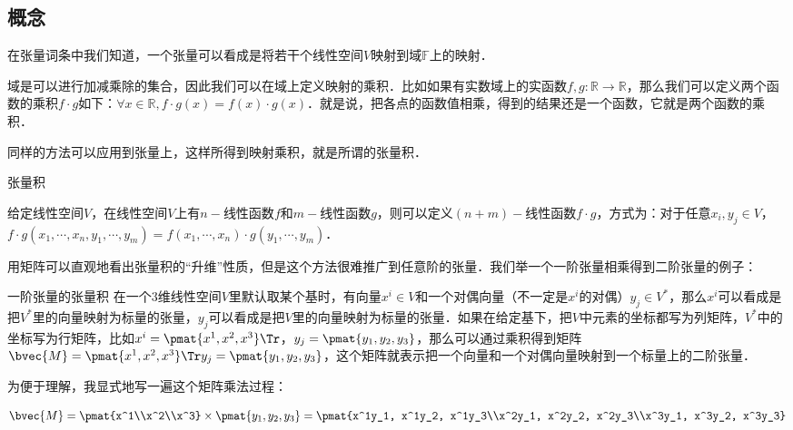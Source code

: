 
\subsection{概念}
在张量词条中我们知道，一个张量可以看成是将若干个线性空间$V$映射到域$\mathbb{F}$上的映射．

域是可以进行加减乘除的集合，因此我们可以在域上定义映射的乘积．比如如果有实数域上的实函数$f, g:\mathbb{R}\rightarrow\mathbb{R}$，那么我们可以定义两个函数的乘积$f\cdot g$如下：$\forall x\in\mathbb{R}, f\cdot g(x)=f(x)\cdot g(x)$．就是说，把各点的函数值相乘，得到的结果还是一个函数，它就是两个函数的乘积．

同样的方法可以应用到张量上，这样所得到映射乘积，就是所谓的张量积．

\begin{definition}{张量积}

给定线性空间$V$，在线性空间$V$上有$n-$线性函数$f$和$m-$线性函数$g$，则可以定义$(n+m)-$线性函数$f\cdot g$，方式为：对于任意$x_i, y_j\in V$，$f\cdot g(x_1, \cdots, x_n, y_1, \cdots, y_m)=f(x_1, \cdots, x_n)\cdot g(y_1, \cdots, y_m)$．

\end{definition}

用矩阵可以直观地看出张量积的“升维”性质，但是这个方法很难推广到任意阶的张量．我们举一个一阶张量相乘得到二阶张量的例子：

\begin{example}{一阶张量的张量积}
在一个$3$维线性空间$V$里默认取某个基时，有向量$x^i\in V$和一个对偶向量（不一定是$x^i$的对偶）$y_j\in V^*$，那么$x^i$可以看成是把$V^*$里的向量映射为标量的张量，$y_j$可以看成是把$V$里的向量映射为标量的张量．如果在给定基下，把$V$中元素的坐标都写为列矩阵，$V^*$中的坐标写为行矩阵，比如$x^i=\pmat{x^1, x^2, x^3}\Tr$，$y_j=\pmat{y_1, y_2, y_3}$，那么可以通过乘积得到矩阵$\bvec{M}=\pmat{x^1, x^2, x^3}\Tr y_j=\pmat{y_1, y_2, y_3}$，这个矩阵就表示把一个向量和一个对偶向量映射到一个标量上的二阶张量．

为便于理解，我显式地写一遍这个矩阵乘法过程：

\begin{equation}
\bvec{M}=\pmat{x^1\\x^2\\x^3}\times\pmat{y_1, y_2, y_3}=\pmat{x^1y_1, x^1y_2, x^1y_3\\x^2y_1, x^2y_2, x^2y_3\\x^3y_1, x^3y_2, x^3y_3}
\end{equation}
\end{example}

